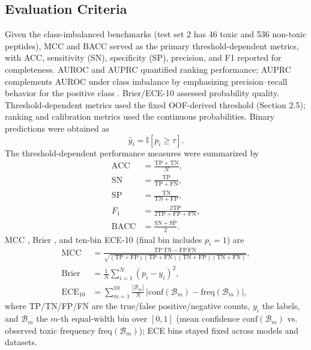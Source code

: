 \documentclass[12pt]{article}
\begin{document}
\subsection{Evaluation Criteria}
Given the class-imbalanced benchmarks (test set 2 has 46 toxic and 536 non-toxic
peptides), MCC and BACC served as the primary threshold-dependent metrics,
with ACC, sensitivity (SN), specificity (SP), precision, and F1 reported for
completeness. AUROC and AUPRC quantified ranking performance; AUPRC complements
AUROC under class imbalance by emphasizing precision--recall behavior for the
positive class \cite{saito2015pr}. Brier/ECE-10 assessed probability quality.
Threshold-dependent metrics used the fixed
OOF-derived threshold (Section 2.5); ranking and calibration metrics used
the continuous probabilities. Binary predictions were obtained as
\begin{equation}
    \hat{y}_i = \mathbb{I}\!\left[p_i \geq \tau\right].
    \label{eq:binary_prediction}
\end{equation}
The threshold-dependent performance measures were summarized by
\begin{align}
    \mathrm{ACC} &= \frac{\mathrm{TP}+\mathrm{TN}}{N},
    \label{eq:acc}\\
    \mathrm{SN} &= \frac{\mathrm{TP}}{\mathrm{TP}+\mathrm{FN}},
    \label{eq:sn}\\
    \mathrm{SP} &= \frac{\mathrm{TN}}{\mathrm{TN}+\mathrm{FP}},
    \label{eq:sp}\\
    F_1 &= \frac{2\mathrm{TP}}
    {2\mathrm{TP}+\mathrm{FP}+\mathrm{FN}},
    \label{eq:f1}\\
    \mathrm{BACC} &= \frac{\mathrm{SN}+\mathrm{SP}}{2}.
    \label{eq:bacc}
\end{align}
MCC \cite{matthews1975mcc},
Brier \cite{brier1950}, and ten-bin ECE-10 \cite{guo2017calibration}
(final bin includes $p_i = 1$) are
\begin{equation}
    \begin{aligned}
        \mathrm{MCC} &= \frac{\mathrm{TP}\,\mathrm{TN} -
        \mathrm{FP}\,\mathrm{FN}}
        {\sqrt{(\mathrm{TP}+\mathrm{FP})(\mathrm{TP}+\mathrm{FN})
        (\mathrm{TN}+\mathrm{FP})(\mathrm{TN}+\mathrm{FN})}},\\
        \mathrm{Brier} &= \frac{1}{N}\sum_{i=1}^{N}(p_i - y_i)^2,\\
        \mathrm{ECE}_{10} &= \sum_{m=1}^{10}\frac{|\mathcal{B}_m|}{N}\,
        \left|\mathrm{conf}(\mathcal{B}_m) -
        \mathrm{freq}(\mathcal{B}_m)\right|,
    \end{aligned}
    \label{eq:metrics}
\end{equation}
where TP/TN/FP/FN are the true/false positive/negative counts, $y_i$ the
labels, and $\mathcal{B}_m$ the $m$-th equal-width bin over $[0,1]$ (mean
confidence $\mathrm{conf}(\mathcal{B}_m)$ vs. observed toxic frequency
$\mathrm{freq}(\mathcal{B}_m)$); ECE bins stayed fixed across models and
datasets.
\end{document}

